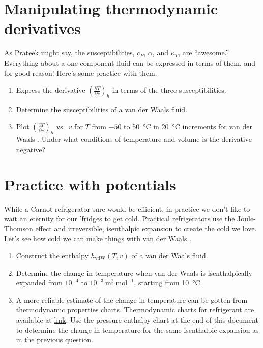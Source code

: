 \documentclass[11pt]{article}
\begin{document}
\section{Manipulating thermodynamic derivatives}
\label{sec:org429086d}
As Prateek might say, the susceptibilities, \(c_P\), \(\alpha\), and \(\kappa_T\), are
  ``awesome.'' Everything about a one component fluid can be expressed in
  terms of them, and for good reason! Here's some practice with them.
\begin{enumerate}
\item Express the derivative \(\left ( \frac{\partial T}{\partial v} \right )_h\) in terms
of the three susceptibilities.

\item Determine the susceptibilities of a van der Waals fluid.

\item Plot \(\left ( \frac{\partial T}{\partial v} \right )_h\)  vs.~\(v\) for \(T\) from \(-50\) to
\SI{50}{\celsius} in \SI{20}{\celsius} increments for van der Waals . Under what
conditions of temperature and volume is the derivative negative?
\end{enumerate}

\section{Practice with potentials}
\label{sec:orgf7bc301}
While a Carnot refrigerator sure would be efficient, in practice we don't
  like to wait an eternity for our 'fridges to get cold.  Practical refrigerators use the
  Joule-Thomson effect and irreversible, isenthalpic expansion to create the cold we
  love.  Let's see how cold we can make things with van der Waals .

\begin{enumerate}
\item Construct the enthalpy \(h_\text{vdW}(T,v)\) of a van der Waals fluid.

\item Determine the change in temperature when van der Waals  is isenthalpically
expanded from \(10^{-4}\) to \(10^{-3}~\text{m}^3~\text{mol}^{-1}\), starting from \SI{10}{\celsius}.

\item A more reliable estimate of the change in temperature can be gotten from thermodynamic properties charts.  Thermodynamic charts for  refrigerant are available at \href{https://i0.wp.com/emersonclimateconversations.com/wp-content/uploads/2015/04/co2-post-3-figure-2.jpg?ssl=1}{link}.  Use the pressure-enthalpy chart at the end of this document to determine the change in temperature for the same isenthalpic expansion as in the previous question.
\end{enumerate}
\end{document}
